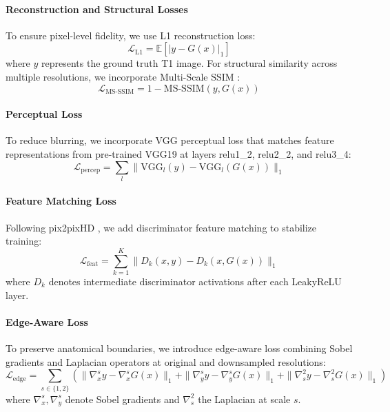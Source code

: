 \documentclass[runningheads]{llncs}
\begin{document}
\paragraph{Reconstruction and Structural Losses}

To ensure pixel-level fidelity, we use L1 reconstruction loss:
\begin{equation}
\mathcal{L}_{\text{L1}} = \mathbb{E}[|y - G(x)|_1]
\end{equation}
where $y$ represents the ground truth T1 image. For structural similarity across multiple resolutions, we incorporate Multi-Scale SSIM \cite{wang2003msssim}:
\begin{equation}
\mathcal{L}_{\text{MS-SSIM}} = 1 - \text{MS-SSIM}(y, G(x))
\end{equation}

\paragraph{Perceptual Loss}

To reduce blurring, we incorporate VGG perceptual loss \cite{johnson2016perceptual} that matches feature representations from pre-trained VGG19 at layers relu1\_2, relu2\_2, and relu3\_4:
\begin{equation}
\mathcal{L}_{\text{percep}} = \sum_{l} \|\text{VGG}_l(y) - \text{VGG}_l(G(x))\|_1
\end{equation}

\paragraph{Feature Matching Loss}

Following pix2pixHD \cite{wang2018pix2pixHD}, we add discriminator feature matching to stabilize training:
\begin{equation}
\mathcal{L}_{\text{feat}} = \sum_{k=1}^{K} \|D_k(x, y) - D_k(x, G(x))\|_1
\end{equation}
where $D_k$ denotes intermediate discriminator activations after each LeakyReLU layer.

\paragraph{Edge-Aware Loss}

To preserve anatomical boundaries, we introduce edge-aware loss combining Sobel gradients and Laplacian operators at original and downsampled resolutions:
\begin{equation}
\mathcal{L}_{\text{edge}} = \sum_{s \in \{1, 2\}} \left( \|\nabla_x^s y - \nabla_x^s G(x)\|_1 + \|\nabla_y^s y - \nabla_y^s G(x)\|_1 + \|\nabla^2_s y - \nabla^2_s G(x)\|_1 \right)
\end{equation}
where $\nabla_x^s, \nabla_y^s$ denote Sobel gradients and $\nabla^2_s$ the Laplacian at scale $s$.
\end{document}
